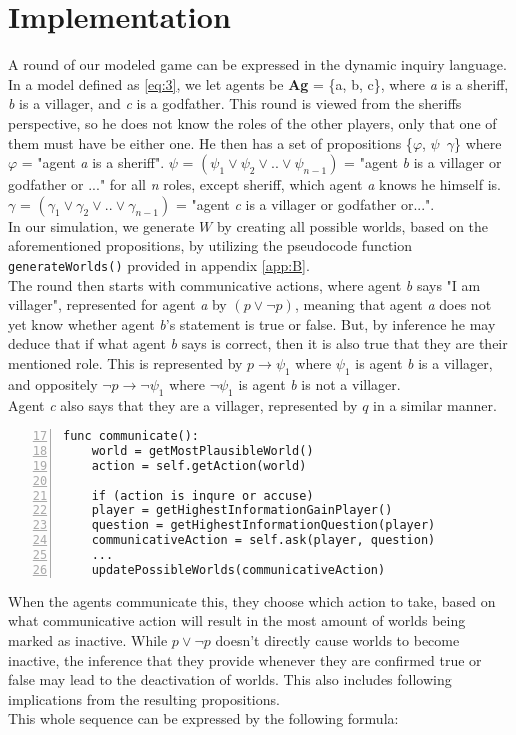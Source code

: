 \section{Implementation}\label{sec:implementation}
A round of our modeled game can be expressed in the dynamic inquiry language. 
In a model defined as \cref{eq:3}, we let agents be \textbf{Ag} = \{a, b, c\}, 
where \textit{a} is a sheriff, \textit{b} is a villager, and \textit{c} is a 
godfather. This round is viewed from the sheriffs perspective, so he does not 
know the roles of the other players, only that one of them must have be either 
one. He then has a set of propositions \{$\varphi$, $\psi$\, $\gamma$\} 
where 
$\varphi$ = "agent \textit{a} 
is a sheriff". $\psi$ = $(\psi_1 \lor \psi_2 \lor .. 
\lor \psi_{n-1})$ = "agent \textit{b} is a villager or godfather or ..." for 
all 
\textit{n} roles, except sheriff, which agent \textit{a} knows he himself is. 
$\gamma$ = $(\gamma_1 \lor 
\gamma_2 \lor .. \lor \gamma_{n-1}) $ = "agent \textit{c} is a villager or 
godfather or...". \\
In our simulation, we generate $W$ by 
creating all possible worlds, based on the aforementioned propositions, by 
utilizing the pseudocode function \lstinline{generateWorlds()} provided in 
appendix \ref{app:B}. \\
The round then starts with communicative actions, where agent \textit{b} says 
"I am villager", represented for agent \textit{a} by $(p \lor \neg p)$, meaning 
that agent \textit{a} does not yet know whether agent \textit{b}'s statement is 
true or false. But, by inference he may deduce that if what agent \textit{b} 
says is correct, then it is also true that they are their mentioned role. This 
is represented by $p \rightarrow \psi_1$ where $\psi_1$ is agent 
\textit{b} is a villager, and oppositely $\neg p \rightarrow \neg \psi_1$ where 
$\neg \psi_1$ is agent 
\textit{b} is not a villager. \\
Agent \textit{c} also says that they are a 
villager, 
represented by $q$ in a similar manner. 

\begin{lstlisting}[basicstyle=\footnotesize\ttfamily, numbers=left, 
xleftmargin=0.5cm, firstnumber=17, caption={Snippet from appendix C}, 
captionpos=b]
	func communicate():
	world = getMostPlausibleWorld()
	action = self.getAction(world)
	
	if (action is inqure or accuse)
	player = getHighestInformationGainPlayer()
	question = getHighestInformationQuestion(player)
	communicativeAction = self.ask(player, question)
	...
	updatePossibleWorlds(communicativeAction)
\end{lstlisting}\label{lst:communicate}
When the agents communicate this, they choose which action to take, based on 
what communicative action will result in the most amount of worlds being marked 
as inactive. While $p \lor \neg p$ doesn't directly cause worlds to become 
inactive, the inference that they provide whenever they are confirmed true or 
false may lead to the deactivation of worlds. This also includes following 
implications from the resulting propositions.\\
This whole sequence can be expressed by the following formula:

